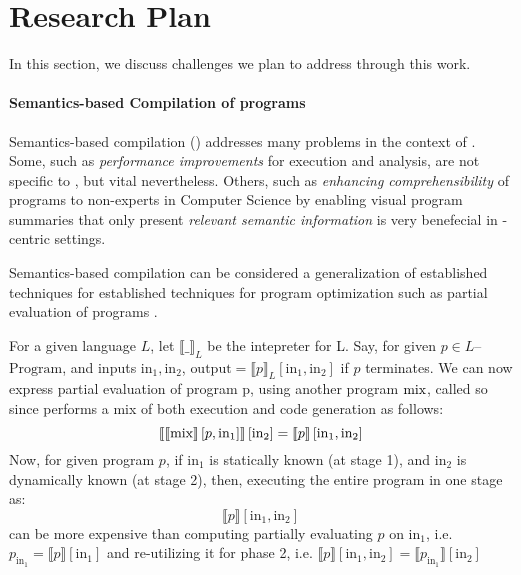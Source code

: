 \section{Research Plan}

In this section, we discuss challenges we plan to address through this work.

\paragraph{Semantics-based Compilation of \MediK{} programs}

Semantics-based compilation (\SBC{}) addresses many problems
in the context of \MediK{}. Some, such as \emph{performance improvements}
for execution and analysis, are not specific to \MediK{}, but vital
nevertheless. Others, such as \emph{enhancing comprehensibility} of programs
to non-experts in Computer Science by enabling visual program summaries that only
present \emph{relevant semantic information} is very benefecial in
\MediK-centric settings.

Semantics-based compilation can be considered a generalization of
established techniques for established techniques for program optimization
such as partial evaluation of programs \cite{Jones93Book}.

For a given language $L$, let $\llbracket\_\rrbracket_{L}$ be the
intepreter for L. Say, for given $p \in L$--$\text{Program}$, and inputs
$\text{in}_1, \text{in}_2$,
$\text{output} = \llbracket p \rrbracket_{L}\left[\text{in}_1,\text{in}_2\right]$
if $p$ terminates.
We can now express partial evaluation of program p, using another
program $\text{mix}$, called so since performs a mix of both execution and code
generation as follows:
  $$\llbracket \llbracket \text{mix} \rrbracket \left[p, \text{in}_1\right] \rrbracket
  \left[\text{in}_2\right]
  = \llbracket p \rrbracket \left[\text{in}_1, \text{in}_2\right]$$
Now, for given program $p$, if $\text{in}_1$ is statically known (at stage 1),
and $\text{in}_2$ is dynamically known (at stage 2), then, executing the
entire program in one stage as:
$$ \llbracket p \rrbracket \left[\text{in}_1, \text{in}_2\right] $$ can be more
expensive than computing partially evaluating $p$ on $\text{in}_1$,
i.e. $p_{\text{in}_1} = \llbracket p \rrbracket \left [ \text{in}_1 \right]$ and
re-utilizing it for phase 2, i.e.
$\llbracket p \rrbracket \left [\text{in}_1, \text{in}_2 \right] = \llbracket
p_{\text{in}_1} \rrbracket \left [ \text{in}_2 \right]$


%

